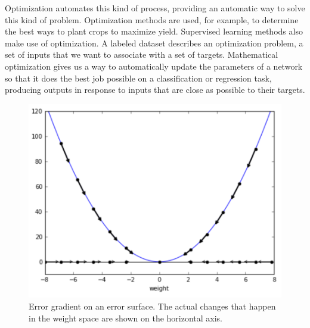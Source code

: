 Optimization automates this kind of process, providing an automatic way to solve this kind of problem. Optimization methods are used, for example, to determine the best ways to plant crops to maximize yield. Supervised learning methods also make use of optimization. A labeled dataset describes an optimization problem, a set of inputs that we want to associate with a set of targets. Mathematical optimization gives us a way to automatically update the parameters of a network so that it does the best job possible on a classification or regression task, producing outputs in response to inputs that are close as possible to their targets.

\begin{figure}[h]
\centering
\includegraphics[scale=.5]{./images/GradientDescent.png}
\caption[Jeff Yoshimi.]{Error gradient on an error surface. The actual changes that happen in the weight space are shown on the horizontal axis.}
\label{gradient_descent}
\end{figure}

